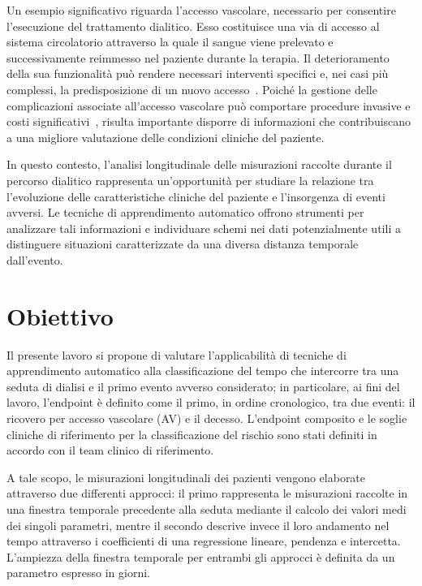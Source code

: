 \documentclass[a4paper,12pt]{report}
\begin{document}
Un esempio significativo riguarda l'accesso vascolare, necessario per consentire l'esecuzione del trattamento dialitico. Esso costituisce una via di accesso al sistema circolatorio attraverso la quale il sangue viene prelevato e successivamente reimmesso nel paziente durante la terapia. Il deterioramento della sua funzionalità può rendere necessari interventi specifici e, nei casi più complessi, la predisposizione di un nuovo accesso~\cite{LOK2020S1}. Poiché la gestione delle complicazioni associate all'accesso vascolare può comportare procedure invasive e costi significativi~\cite{AVCCostItaly2024}, risulta importante disporre di informazioni che contribuiscano a una migliore valutazione delle condizioni cliniche del paziente.

In questo contesto, l'analisi longitudinale delle misurazioni raccolte durante il percorso dialitico rappresenta un'opportunità per studiare la relazione tra l'evoluzione delle caratteristiche cliniche del paziente e l'insorgenza di eventi avversi. Le tecniche di apprendimento automatico offrono strumenti per analizzare tali informazioni e individuare schemi nei dati potenzialmente utili a distinguere situazioni caratterizzate da una diversa distanza temporale dall'evento.

\section{Obiettivo}

Il presente lavoro si propone di valutare l'applicabilità di tecniche di apprendimento automatico alla classificazione del tempo che intercorre tra una seduta di dialisi e il primo evento avverso considerato; in particolare, ai fini del lavoro, l'endpoint è definito come il primo, in ordine cronologico, tra due eventi: il ricovero per accesso vascolare (AV) e il decesso. L'endpoint composito e le soglie cliniche di riferimento per la classificazione del rischio sono stati definiti in accordo con il team clinico di riferimento.

A tale scopo, le misurazioni longitudinali dei pazienti vengono elaborate attraverso due differenti approcci: il primo rappresenta le misurazioni raccolte in una finestra temporale precedente alla seduta mediante il calcolo dei valori medi dei singoli parametri, mentre il secondo descrive invece il loro andamento nel tempo attraverso i coefficienti di una regressione lineare, pendenza e intercetta. L'ampiezza della finestra temporale per entrambi gli approcci è definita da un parametro espresso in giorni.
\end{document}
